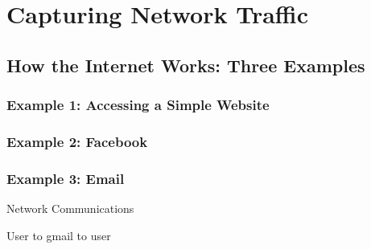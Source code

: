 \chapter{Capturing Network Traffic}
\section{How the Internet Works: Three Examples}

\subsection{Example 1: Accessing a Simple Website}

\subsection{Example 2: Facebook}

\subsection{Example 3: Email}

Network Communications

User to gmail to user
